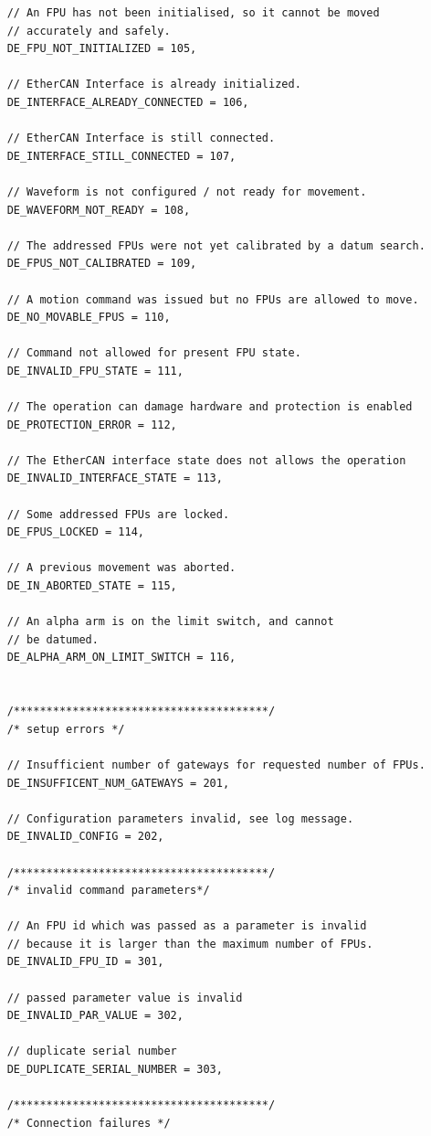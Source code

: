 \documentclass[11pt,a4paper]{scrartcl}
\begin{document}
\begin{verbatim}
    // An FPU has not been initialised, so it cannot be moved
    // accurately and safely.
    DE_FPU_NOT_INITIALIZED = 105,

    // EtherCAN Interface is already initialized.
    DE_INTERFACE_ALREADY_CONNECTED = 106,

    // EtherCAN Interface is still connected.
    DE_INTERFACE_STILL_CONNECTED = 107,

    // Waveform is not configured / not ready for movement.
    DE_WAVEFORM_NOT_READY = 108,

    // The addressed FPUs were not yet calibrated by a datum search.
    DE_FPUS_NOT_CALIBRATED = 109,

    // A motion command was issued but no FPUs are allowed to move.
    DE_NO_MOVABLE_FPUS = 110,

    // Command not allowed for present FPU state.
    DE_INVALID_FPU_STATE = 111,

    // The operation can damage hardware and protection is enabled
    DE_PROTECTION_ERROR = 112,

    // The EtherCAN interface state does not allows the operation
    DE_INVALID_INTERFACE_STATE = 113,

    // Some addressed FPUs are locked.
    DE_FPUS_LOCKED = 114,

    // A previous movement was aborted.
    DE_IN_ABORTED_STATE = 115,

    // An alpha arm is on the limit switch, and cannot
    // be datumed.
    DE_ALPHA_ARM_ON_LIMIT_SWITCH = 116,


    /***************************************/
    /* setup errors */

    // Insufficient number of gateways for requested number of FPUs.
    DE_INSUFFICENT_NUM_GATEWAYS = 201,

    // Configuration parameters invalid, see log message.
    DE_INVALID_CONFIG = 202,

    /***************************************/
    /* invalid command parameters*/

    // An FPU id which was passed as a parameter is invalid
    // because it is larger than the maximum number of FPUs.
    DE_INVALID_FPU_ID = 301,

    // passed parameter value is invalid
    DE_INVALID_PAR_VALUE = 302,

    // duplicate serial number
    DE_DUPLICATE_SERIAL_NUMBER = 303,

    /***************************************/
    /* Connection failures */


\end{verbatim}
\end{document}
